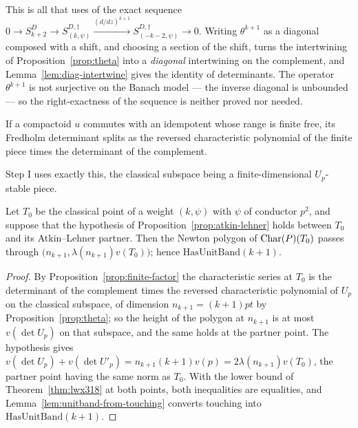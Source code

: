 This is all that \cite[\S3.23 Step III]{LWX} uses of the exact sequence
$0 \to S^{D}_{k+2} \to S^{D,\dagger}_{(k,\psi)} \xrightarrow{(d/dz)^{k+1}}
S^{D,\dagger}_{(-k-2,\psi)} \to 0$.  Writing $\theta^{k+1}$ as a diagonal composed with a shift,
and choosing a section of the shift, turns the intertwining of Proposition~\ref{prop:theta} into
a \emph{diagonal} intertwining on the complement, and Lemma~\ref{lem:diag-intertwine} gives the
identity of determinants.  The operator $\theta^{k+1}$ is not surjective on the Banach model ---
the inverse diagonal is unbounded --- so the right-exactness of the sequence is neither proved nor
needed.

\begin{proposition}
  \label{prop:finite-factor}
  \leanok
  If a compactoid $u$ commutes with an idempotent whose range is finite free, its Fredholm
  determinant splits as the reversed characteristic polynomial of the finite piece times the
  determinant of the complement.
\end{proposition}

Step I uses exactly this, the classical subspace being a finite-dimensional $U_p$-stable piece.

\begin{theorem}
  \label{thm:lwx-stepone}
  \leanok
  Let $T_0$ be the classical point of a weight $(k,\psi)$ with $\psi$ of conductor $p^{2}$, and
  suppose that the hypothesis of Proposition~\ref{prop:atkin-lehner} holds between $T_0$ and its
  Atkin--Lehner partner.  Then the Newton polygon of $\operatorname{Char}(P)(T_0)$ passes through
  $\bigl(n_{k+1}, \lambda(n_{k+1})v(T_0)\bigr)$; hence $\mathrm{HasUnitBand}(k+1)$.
\end{theorem}

\begin{proof}
  \leanok
  By Proposition~\ref{prop:finite-factor} the characteristic series at $T_0$ is the determinant of
  the complement times the reversed characteristic polynomial of $U_p$ on the classical subspace,
  of dimension $n_{k+1} = (k+1)pt$ by Proposition~\ref{prop:theta}; so the height of the polygon at
  $n_{k+1}$ is at most $v(\det U_p)$ on that subspace, and the same holds at the partner point.
  The hypothesis gives $v(\det U_p) + v(\det U'_p) = n_{k+1}(k+1)v(p) = 2\lambda(n_{k+1})v(T_0)$,
  the partner point having the same norm as $T_0$.  With the lower bound of
  Theorem~\ref{thm:lwx318} at both points, both inequalities are equalities, and
  Lemma~\ref{lem:unitband-from-touching} converts touching into $\mathrm{HasUnitBand}(k+1)$.
\end{proof}

